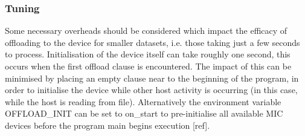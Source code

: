 \documentclass[runningheads,a4paper]{llncs}
\begin{document}


\subsubsection{Tuning}
\label{sect:tuning}

Some necessary overheads should be considered which impact the efficacy of offloading to the device for smaller datasets, 
i.e. those taking just a few seconds to process. Initialisation of the device itself can take roughly one second, this 
occurs when the first offload clause is encountered. The impact of this can be minimised by placing an empty clause near 
to the beginning of the program, in order to initialise the device while other host activity is occurring (in this case, 
while the host is reading from file). Alternatively the environment variable OFFLOAD\_INIT can be set to on\_start to 
pre-initialise all available MIC devices before the program main begins execution [ref]. 

\end{document}
